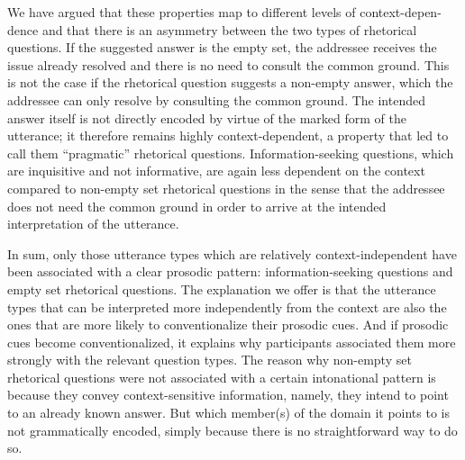 \documentclass[output=paper,colorlinks,citecolor=brown            ,chinesefont]{langscibook}
\begin{document}
We have argued that these properties map to different levels of context-depen-dence and that there is an asymmetry between the two types of rhetorical questions. If the suggested answer is the empty set, the addressee receives the issue already resolved and there is no need to consult the common ground. This is not the case if the rhetorical question suggests a non-empty answer, which the addressee can only resolve by consulting the common ground. The intended answer itself is not directly encoded by virtue of the marked form of the utterance; it therefore remains highly context-dependent, a property that led \citet{Jamieson2018phd} to call them ``pragmatic'' rhetorical questions. Information-seeking questions, which are inquisitive and not informative, are again less dependent on the context compared to non-empty set rhetorical questions in the sense that the addressee does not need the common ground in order to arrive at the intended interpretation of the utterance. 

In sum, only those utterance types which are relatively context-independent have been associated with a clear prosodic pattern: information-seeking questions and empty set rhetorical questions. The explanation we offer is that the utterance types that can be interpreted more independently from the context are also the ones that are more likely to conventionalize their prosodic cues. And if prosodic cues become conventionalized, it explains why participants associated them more strongly with the relevant question types. The reason why non-empty set rhetorical questions were not associated with a certain intonational pattern is because they convey context-sensitive information, namely, they intend to point to an already known answer. But which member(s) of the domain it points to is not grammatically encoded, simply because there is no straightforward way to do so. 

\end{document}
